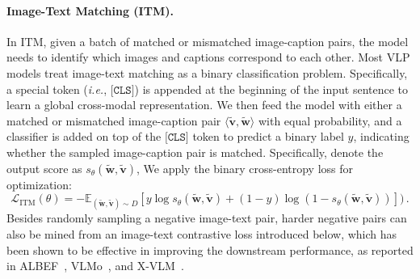 \paragraph{Image-Text Matching (ITM).} In ITM, given a batch of matched or mismatched image-caption pairs, the model needs to identify which images and captions correspond to each other. Most VLP models treat image-text matching as a binary classification problem. Specifically, a special token (\emph{i.e.}, $\texttt{[CLS]}$) is
appended at the beginning of the input sentence to learn a global cross-modal representation. We then feed the model with either a matched or mismatched image-caption pair $\langle \tilde{\mathbf{v}}, \tilde{\mathbf{w}} \rangle$ with equal probability, and a classifier is added on top of the $\texttt{[CLS]}$ token to predict
a binary label $y$, indicating whether the sampled image-caption pair is matched. Specifically, denote the output score as $s_{\theta}(\tilde{\mathbf{w}}, \tilde{\mathbf{v}})$, We apply the binary cross-entropy loss for optimization:
\begin{equation}
    \mathcal{L}_{\text{ITM}}(\theta) = - \mathbb{E}_{(\tilde{\mathbf{w}}, \tilde{\mathbf{v}})\sim D} [y \log s_{\theta}(\tilde{\mathbf{w}}, \tilde{\mathbf{v}}) + (1-y) \log (1-s_{\theta}(\tilde{\mathbf{w}}, \tilde{\mathbf{v}}))] )\,.
\end{equation}
Besides randomly sampling a negative image-text pair, harder negative pairs can also be mined from an image-text contrastive loss introduced below, which has been shown to be effective in improving the downstream performance, as reported in ALBEF~\citep{li2021align}, VLMo~\citep{wang2021vlmo}, and X-VLM~\citep{zeng2022x}. 

